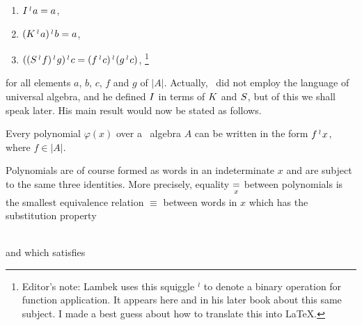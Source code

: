 \begin{enumerate}
\item[(1)] $\cI \app a = a$,

\item[(2)] $(\cK \app a) \app b = a$,

\item[(3)] $((\cS \app f) \app g) \app c = (f \app c) \app\, (g \app c)$,%
\footnote{Editor's note: Lambek uses this squiggle $\app$ to denote a binary operation for function application. It appears here and in his later book about this same subject. I made a best guess about how to translate this into \LaTeX.}

\end{enumerate}


\noindent
for all elements $a$, $b$, $c$, $f$ and $g$ of $|A|$.
Actually, \schon\ did not employ the language of universal algebra, and he defined $\cI$ in terms of $\cK$ and $\cS$, but of this we shall speak later. His main result would now be stated as follows.

\begin{prop}
Every polynomial $\varphi(x)$ over a \schon\ algebra $A$ can be written in the form $f \app x$, where $f \in |A|$.
\end{prop}
Polynomials are of course formed as words in an indetermi­nate $x$ and are subject to the same three identities. More pre­cisely, equality $\underrel{x}{=}$ between polynomials is the smallest equi­valence relation $\equiv$ between words in $x$ which has the substitution property

\be
{}
  \\
\ee
and which satisfies




\begin{thebibliography}{888}



\end{thebibliography}
